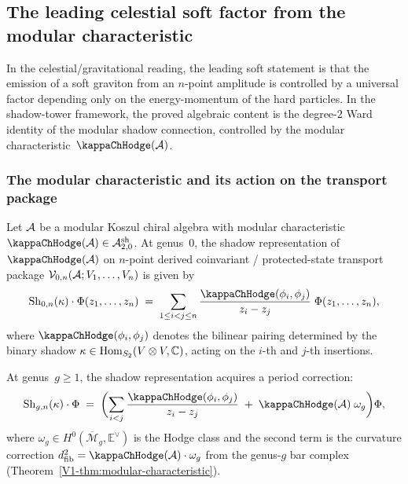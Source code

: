 %
%

\subsection{The leading celestial soft factor from the modular characteristic}
\label{subsec:thqg-VI-leading-soft}

In the celestial/gravitational reading, the leading soft statement
is that the emission of a soft graviton from
an $n$-point amplitude is controlled by a universal factor depending
only on the energy-momentum of the hard particles. In the
shadow-tower framework, the proved algebraic content is the
degree-$2$ Ward identity of the modular shadow connection, controlled
by the modular characteristic~$\kappaChHodge(\cA)$.

\subsubsection{The modular characteristic and its action on
the transport package}

\begin{proposition}
\label{prop:thqg-VI-kappa-action}
Let $\mathcal{A}$ be a modular Koszul chiral algebra with modular
characteristic $\kappaChHodge(\cA) \in \cA^{\mathrm{sh}}_{2,0}$.
At genus~$0$, the shadow representation of $\kappaChHodge(\cA)$ on
$n$-point derived coinvariant / protected-state transport package
$\mathcal{V}_{0,n}(\mathcal{A}; V_1, \dotsc, V_n)$
is given by
\begin{equation}%
\Sh_{0,n}(\kappa) \cdot \Phi(z_1, \dotsc, z_n)
\;=\;
\sum_{1 \leq i < j \leq n}
\frac{\kappaChHodge(\phi_i, \phi_j)}{z_i - z_j}\;
\Phi(z_1, \dotsc, z_n),
\end{equation}
where $\kappaChHodge(\phi_i, \phi_j)$ denotes the bilinear pairing
determined by the binary shadow $\kappa \in \operatorname{Hom}_{S_2}(V \otimes V, \mathbb{C})$,
acting on the $i$-th and $j$-th insertions.

At genus~$g \geq 1$, the shadow representation acquires a period
correction:
\begin{equation}%
\Sh_{g,n}(\kappa) \cdot \Phi
\;=\;
\biggl(\sum_{i < j}
\frac{\kappaChHodge(\phi_i, \phi_j)}{z_i - z_j}
\;+\;
\kappaChHodge(\cA)\;\omega_g\biggr)\Phi,
\end{equation}
where $\omega_g \in H^0(\overline{\mathcal{M}}_g, \mathbb{E}^\vee)$
is the Hodge class and the second term is the curvature correction
$\dfib^2 = \kappaChHodge(\cA) \cdot \omega_g$ from the genus-$g$ bar
complex (Theorem~\ref{V1-thm:modular-characteristic}).
\end{proposition}

